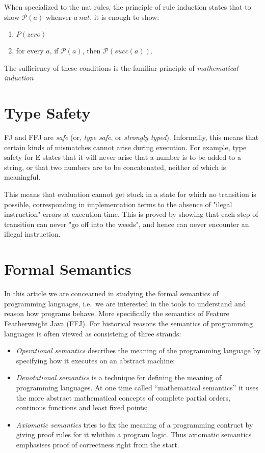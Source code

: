 When specialized to the nat rules, the principle of rule induction states that to show $\mathcal{P}(a)$ whenver $a \ nat$, it is enough to show:

\begin{enumerate}
        \item $P(zero)$
        \item for every $a$, if $\mathcal{P}(a)$, then $\mathcal{P}(succ(a))$.
\end{enumerate}
The sufficiency of these conditions is the familiar principle of \textit{mathematical induction}

\section{Type Safety}
FJ and FFJ are \textit{safe} (or, \textit{type safe}, or \textit{strongly
typed}). Informally, this means that certain kinds of mismatches cannot
arise during execution. For example, type safety for E states
that it will never arise that a number is to be added to a
string, or that two
numbers are to be concatenated, neither of which is meaningful.

This means that evaluation cannot get stuck in a state for which no
transition is possible, corresponding in implementation terms to the
absence of "ilegal instruction" errors at execution time. This is proved
by showing that each step of transition can never "go off into the
weeds", and hence can never encounter an illegal instruction.


\section{Formal Semantics} 
In this article we are concearned in studying the formal semantics of
programming languages, i.e.\ we are interested in the tools to understand and
reason how programs behave. More specifically the semantics of Feature
Featherweight Java (FFJ).  For historical reasons the semantics of programming
languages is often viewed as consisteing of three strands: 

\begin{itemize} 
    \item \textit{Operational semantics} describes the meaning of the
        programming language by specifying how it executes on an abstract machine;

    \item \textit{Denotational semantics} is a technique for defining the
    meaning of programming languages. At one time called ``mathematical
    semantics'' it uses the more abstract mathematical concepts of complete
    partial orders, continous functions and least fixed points; 

    \item \textit{Axiomatic semantics} tries to fix the meaning of a programming
        contruct by giving proof rules for it whithin a program logic. Thus
        axiomatic semantics emphasises proof of correctness right from the start.
\end{itemize}

